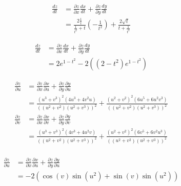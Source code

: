 \documentclass[8pt]{extarticle}
\title{}
\author{Avinash Iyer}
\date{}
\begin{document}
  \begin{problem}{14.6}
    \begin{description}[font=\normalfont]
      \item[4:]
        \begin{align*}
          \frac{dz}{dt} &= \frac{\partial z}{\partial x}\frac{dx}{dt} + \frac{\partial z}{\partial y}\frac{dy}{dt}\\
                        &= \frac{2\frac{1}{t}}{\frac{1}{t^2} + t}\left(-\frac{1}{t^2}\right) + \frac{2\sqrt{t}}{t + \frac{1}{t^2}}
        \end{align*}
      \item[6:]
        \begin{align*}
          \frac{dz}{dt} &= \frac{\partial z}{\partial x}\frac{dx}{dt} + \frac{\partial z}{\partial y}\frac{dy}{dt}\\
                        &= 2e^{1-t^2} -2\left((2-t^2)e^{1-t^2}\right)
        \end{align*}
      \item[8:]
        \begin{align*}
          \frac{\partial z}{\partial u} &= \frac{\partial z}{\partial x}\frac{\partial x}{\partial u} + \frac{\partial z}{\partial y}\frac{\partial y}{\partial u}\\
                                        &=\frac{\left(u^3 + v^3\right)^2\left(4u^3 + 4v^2u\right)}{\left(\left(u^2 + v^2\right)\left(u^2 + v^3\right)\right)^2} + \frac{\left(u^2 + v^2\right)^2\left(6u^5 + 6u^2v^3\right)}{\left(\left(u^2 + v^2\right)\left(u^2 + v^3\right)\right)^2}\\
          \frac{\partial z}{\partial v} &= \frac{\partial z}{\partial x}\frac{\partial x}{\partial v} + \frac{\partial z}{\partial y}\frac{\partial y}{\partial v}\\
                                        &=\frac{\left(u^3 + v^3\right)^2\left(4v^3 + 4u^2v\right)}{\left(\left(u^2 + v^2\right)\left(u^2 + v^3\right)\right)^2} + \frac{\left(u^2 + v^2\right)^2\left(6v^5 + 6v^2u^3\right)}{\left(\left(u^2 + v^2\right)\left(u^2 + v^3\right)\right)^2}\\
        \end{align*}
      \item[14:]
        \begin{align*}
          \frac{\partial z}{\partial u} &= \frac{\partial z}{\partial x}\frac{\partial x}{\partial u} + \frac{\partial z}{\partial y}\frac{\partial y}{\partial u}\\
                                        &= -2\left(\cos(v)\sin(u^2) + \sin(v)\sin(u^2)\right)\\

\end{align*}
\end{description}
\end{problem}
\end{document}
